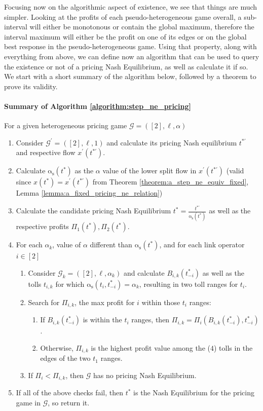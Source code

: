 \documentclass[10pt,a4paper]{book}
\newcommand{\as}{\mathrm{\alpha_s}}
\newcommand{\Gm}{\mathcal{G}}
\theoremstyle{definition}
\theoremstyle{comment}
\begin{document}
Focusing now on the algorithmic aspect of existence, we see that things are much simpler.
Looking at the profits of each pseudo-heterogeneous game overall, a sub-interval will either be monotonous or contain the global maximum, therefore the interval maximum will either be the profit on one of its edges or on the global best response in the pseudo-heterogeneous game.
Using that property, along with everything from above, we can define now an algorithm that can be used to query the existence or not of a pricing Nash Equilibrium, as well as calculate it if so.
We start with a short summary of the algorithm below, followed by a theorem to prove its validity.

\paragraph{Summary of Algorithm \ref{algorithm:step_ne_pricing}}
For a given heterogeneous pricing game $\Gm = ([2], \ell, \alpha)$
\begin{enumerate}
	\item Consider $\Gm^\prime = ([2], \ell, 1)$ and calculate its pricing Nash equilibrium $t^{*\prime}$ and respective flow $x^\prime(t^{*\prime})$.
	\item Calculate $\as(t^*)$ as the $\alpha$ value of the lower split flow in $x^\prime(t^{*\prime})$ (valid since $x(t^*) = x^\prime(t^{*\prime})$ from Theorem \ref{theorem:a_step_ne_equiv_fixed}, Lemma \ref{lemma:a_fixed_pricing_ne_relation})
	\item Calculate the candidate pricing Nash Equilibrium $t^* = \tfrac{t^{*\prime}}{\as(t^*)}$ as well as the respective profits $\Pi_1(t^*), \Pi_2(t^*)$.
	\item For each $\alpha_k$, value of $\alpha$ different than $\as(t^*)$, and for each link operator $i \in [2]$
	\begin{enumerate}[$4.1$]
		\item Consider $\Gm_k = ([2], \ell, \alpha_k)$ and calculate $B_{i, k}(t_{-i}^*)$ as well as the tolls $t_{i, k}$ for which $\as(t_i, t_{-i}^*) = \alpha_k$, resulting in two toll ranges for $t_i$.
		\item Search for $\Pi_{i, k}$, the max profit for $i$ within those $t_i$ ranges:
		\begin{enumerate}[$4.2.1$]
			\item If $B_{i, k}(t_{-i}^*)$ is within the $t_i$ ranges, then $\Pi_{i, k} = \Pi_i(B_{i, k}(t_{-i}^*), t_{-i}^*)$.
			\item Otherwise, $\Pi_{i, k}$ is the highest profit value among the ($4$) tolls in the edges of the two $t_1$ ranges.
		\end{enumerate}
		\item If $\Pi_i < \Pi_{i, k}$, then $\Gm$ has no pricing Nash Equilibrium.
	\end{enumerate}
	\item If all of the above checks fail, then $t^*$ is the Nash Equilibrium for the pricing game in $\Gm$, so return it.
\end{enumerate}
\end{document}

